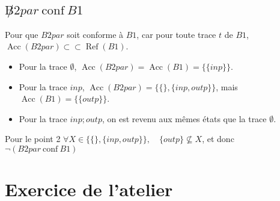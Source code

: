 \documentclass[a4paper,french,12pt]{article}
\def\conf{\ \text{conf}\ }
\DeclareMathOperator{\Acc}{Acc}
\DeclareMathOperator{\Ref}{Ref}
\begin{document}
\subsection{$\not B2par \conf B1$}

Pour que $B2par$ soit conforme à $B1$, car pour toute trace $t$ de $B1$,
$\Acc(B2par) \subset\subset \Ref(B1)$.

\begin{itemize}
\item Pour la trace $\emptyset$, $\Acc(B2par) = \Acc(B1) = \{\{inp\}\}$.
\item Pour la trace $inp$, $\Acc(B2par) = \{\{\}, \{inp,outp\}\}$, mais $\Acc(B1) = \{\{outp\}\}$.
\item Pour la trace $inp;outp$, on est revenu aux mêmes états que la trace $\emptyset$.
\end{itemize}
Pour le point 2 $\forall X \in \{\{\}, \{inp,outp\}\},\quad \{outp\} \not\subseteq X$, et donc $\neg(B2par \conf B1)$

\section{Exercice de l'atelier}
\end{document}
